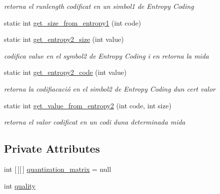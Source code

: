 \begin{DoxyCompactItemize}
\begin{DoxyCompactList}\small\item\em retorna el runlength codificat en un simbol1 de Entropy Coding \end{DoxyCompactList}\item 
static int \hyperlink{classdomini_1_1algorithm_1_1JPEG_a8d1005fb7833d36a064afb1c5e15bbd3}{get\+\_\+size\+\_\+from\+\_\+entropy1} (int code)
\item 
static int \hyperlink{classdomini_1_1algorithm_1_1JPEG_aa9bc9bee7181efee254be843e23ee2c6}{get\+\_\+entropy2\+\_\+size} (int value)
\begin{DoxyCompactList}\small\item\em codifica value en el symbol2 de Entropy Coding i en retorna la mida \end{DoxyCompactList}\item 
static int \hyperlink{classdomini_1_1algorithm_1_1JPEG_a0ccbcda5311dc96a30e5cb7f2a5b95b5}{get\+\_\+entropy2\+\_\+code} (int value)
\begin{DoxyCompactList}\small\item\em retorna la codifiacació en el simbol2 de Entropy Coding d\textquotesingle{}un cert valor \end{DoxyCompactList}\item 
static int \hyperlink{classdomini_1_1algorithm_1_1JPEG_a41c69fe2e29999dd17a555859df22530}{get\+\_\+value\+\_\+from\+\_\+entropy2} (int code, int size)
\begin{DoxyCompactList}\small\item\em retorna el valor codificat en un codi d\textquotesingle{}una determinada mida \end{DoxyCompactList}\end{DoxyCompactItemize}
\subsection*{Private Attributes}
\begin{DoxyCompactItemize}
\item 
int \mbox{[}$\,$\mbox{]}\mbox{[}$\,$\mbox{]} \hyperlink{classdomini_1_1algorithm_1_1JPEG_a7c95eb140dbe185a31b402d48ec17a66}{quantization\+\_\+matrix} = null
\item 
int \hyperlink{classdomini_1_1algorithm_1_1JPEG_ae80176d5ff56e613643db55e21c513da}{quality}
\end{DoxyCompactItemize}
